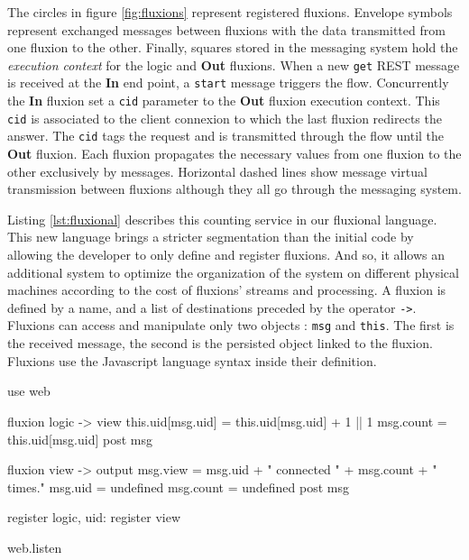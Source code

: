 The circles in figure \ref{fig:fluxions} represent registered fluxions.
Envelope symbols represent exchanged messages between fluxions with the data transmitted from one fluxion to the other. Finally, squares stored in the messaging system hold the \textit{execution context} for the logic and \textbf{Out} fluxions.
When a new \texttt{get} REST message is received at the \textbf{In} end point, a \texttt{start} message triggers the flow.
Concurrently the \textbf{In} fluxion set a \texttt{cid} parameter to the \textbf{Out} fluxion execution context.
This \texttt{cid} is associated to the client connexion to which the last fluxion redirects the answer.
The \texttt{cid} tags the request and is transmitted through the flow until the \textbf{Out} fluxion.
Each fluxion propagates the necessary values from one fluxion to the other exclusively by messages.
Horizontal dashed lines show message virtual transmission between fluxions although they all go through the messaging system.

Listing \ref{lst:fluxional} describes this counting service in our fluxional language.
This new language brings a stricter segmentation than the initial code by allowing the developer to only define and register fluxions.
And so, it allows an additional system to optimize the organization of the system on different physical machines according to the cost of fluxions' streams and processing.
A fluxion is defined by a name, and a list of destinations preceded by the operator \texttt{-}\texttt{>}.
Fluxions can access and manipulate only two objects : \texttt{msg} and \texttt{this}.
The first is the received message, the second is the persisted object linked to the fluxion.
Fluxions use the Javascript language syntax inside their definition.


\begin{code}[Javascript, caption={Fluxional sample},label={lst:fluxional}]
use web

fluxion logic -> view
  this.uid[msg.uid] = this.uid[msg.uid] + 1 || 1
  msg.count = this.uid[msg.uid]
  post msg

fluxion view -> output
  msg.view = msg.uid + " connected " + msg.count + " times."
  msg.uid = undefined
  msg.count = undefined
  post msg

register logic, {uid: {}}
register view

web.listen
\end{code}


